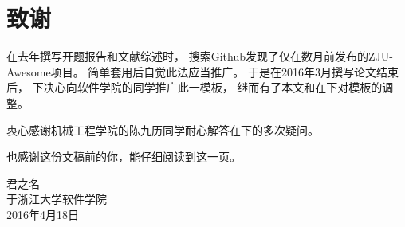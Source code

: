 \chapter{致\ZJUspace{}谢}

在去年撰写开题报告和文献综述时，
搜索Github发现了仅在数月前发布的ZJU-Awesome项目。
简单套用后自觉此法应当推广。
于是在2016年3月撰写论文结束后，
下决心向软件学院的同学推广此一模板，
继而有了本文和在下对模板的调整。

衷心感谢机械工程学院的陈九历同学耐心解答在下的多次疑问。

也感谢这份文稿前的你，能仔细阅读到这一页。

\vspace{2cm}
\hfill
\begin{minipage}{14em}
    \begin{flushright}
        君之名\\
        于浙江大学软件学院\\ %
        2016年4月18日   %
    \end{flushright}
\end{minipage}
